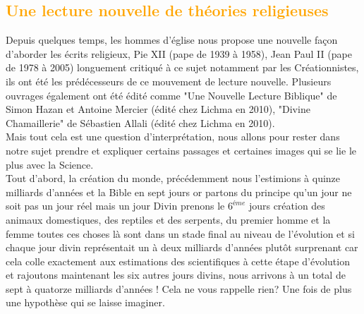 \textcolor{orange}{\chapter{Une lecture nouvelle de théories religieuses}}
Depuis quelques temps, les hommes d'église nous propose une nouvelle façon 
d'aborder les écrits religieux, Pie XII (pape de 1939 à 1958), Jean Paul II 
(pape de 1978 à 2005) longuement critiqué à ce sujet notamment par les 
Créationnistes, ils ont été les prédécesseurs de ce mouvement de lecture nouvelle.
Plusieurs ouvrages également ont été édité comme "Une Nouvelle Lecture Biblique"
de Simon Hazan et Antoine Mercier (édité chez Lichma en 2010), 
"Divine Chamaillerie" de Sébastien Allali (édité chez Lichma en 2010).\\
Mais tout cela est une question d'interprétation, nous allons pour rester dans 
notre sujet  prendre et expliquer certains passages et certaines images qui se 
lie le plus avec la Science.\\
Tout d'abord, la création du monde, précédemment nous l'estimions à quinze milliards
d'années et la Bible en sept jours or partons du principe qu'un jour ne soit pas un
jour réel mais un jour Divin prenons le $6^{éme}$ jours création des animaux 
domestiques, des reptiles et des serpents, du premier homme et la femme toutes
ces choses là sont dans un stade final au niveau de l'évolution  et si chaque 
jour divin représentait un à deux milliards d'années plutôt surprenant car cela 
colle exactement aux estimations des scientifiques à cette étape 
d'évolution et rajoutons maintenant les six autres jours divins, nous arrivons à
un total de sept à quatorze milliards d'années ! 
Cela ne vous rappelle rien? Une fois de plus une hypothèse qui se
laisse imaginer.\\ \\

